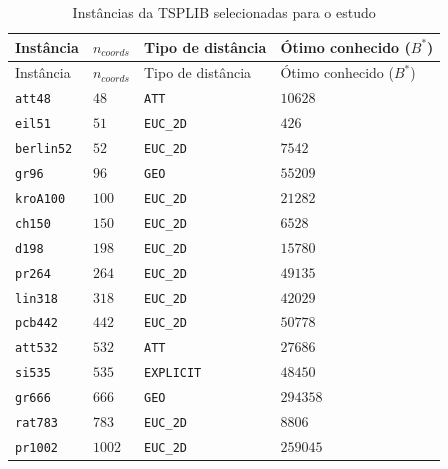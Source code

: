 \begin{tabelapadrao}
\begin{longtable}[]{@{}
            >{\raggedright\arraybackslash}p{}
            >{\centering\arraybackslash}p{}
            >{\centering\arraybackslash}p{}
            >{\raggedleft\arraybackslash}p{}@{}}
      \caption{Instâncias da TSPLIB selecionadas para o estudo}\label{tbl:selected-instances}\tabularnewline
      \toprule\noalign{}
      Instância         & \(n_{coords}\) & Tipo de distância & Ótimo conhecido (\(B^*\)) \\
      \midrule\noalign{}
      \endfirsthead
      \toprule\noalign{}
      Instância         & \(n_{coords}\) & Tipo de distância & Ótimo conhecido (\(B^*\)) \\
      \midrule\noalign{}
      \endhead
      \bottomrule\noalign{}
      \endlastfoot
      \texttt{att48}    & \(48\)         & \texttt{ATT}      & \(10628\)                 \\*
      \texttt{eil51}    & \(51\)         & \texttt{EUC\_2D}  & \(426\)                   \\*
      \texttt{berlin52} & \(52\)         & \texttt{EUC\_2D}  & \(7542\)                  \\*
      \texttt{gr96}     & \(96\)         & \texttt{GEO}      & \(55209\)                 \\*
      \texttt{kroA100}  & \(100\)        & \texttt{EUC\_2D}  & \(21282\)                 \\*
      \texttt{ch150}    & \(150\)        & \texttt{EUC\_2D}  & \(6528\)                  \\*
      \texttt{d198}     & \(198\)        & \texttt{EUC\_2D}  & \(15780\)                 \\*
      \texttt{pr264}    & \(264\)        & \texttt{EUC\_2D}  & \(49135\)                 \\*
      \texttt{lin318}   & \(318\)        & \texttt{EUC\_2D}  & \(42029\)                 \\*
      \texttt{pcb442}   & \(442\)        & \texttt{EUC\_2D}  & \(50778\)                 \\*
      \texttt{att532}   & \(532\)        & \texttt{ATT}      & \(27686\)                 \\*
      \texttt{si535}    & \(535\)        & \texttt{EXPLICIT} & \(48450\)                 \\*
      \texttt{gr666}    & \(666\)        & \texttt{GEO}      & \(294358\)                \\*
      \texttt{rat783}   & \(783\)        & \texttt{EUC\_2D}  & \(8806\)                  \\*
      \texttt{pr1002}   & \(1002\)       & \texttt{EUC\_2D}  & \(259045\)                \\
\end{longtable}
\end{tabelapadrao}

